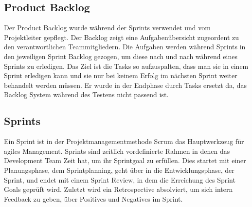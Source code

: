 \subsection{Product Backlog}\label{subsec:product-backlog}
%

Der Product Backlog wurde während der Sprints verwendet und vom Projektleiter gepflegt. Der Backlog zeigt eine Aufgabenübersicht zugeordent zu den verantwortlichen Teammitgliedern.
Die Aufgaben werden während Sprints in den jeweiligen Sprint Backlog gezogen, um diese nach und nach während eines Sprints zu erledigen.
Das Ziel ist die Tasks so aufzuspalten, dass man sie in einem Sprint erledigen kann und sie nur bei keinem Erfolg im nächsten Sprint weiter behandelt werden müssen.
Er wurde in der Endphase durch Tasks ersetzt da, das Backlog System während des Testens nicht passend ist.
%

\subsection{Sprints}\label{subsec:sprints}
%
Ein Sprint ist in der Projektmanagementmethode Scrum das Hauptwerkzeug für agiles Management. Sprints sind zeitlich vordefinierte Rahmen in denen das Development Team Zeit hat, um ihr Sprintgoal zu erfüllen.
Dies startet mit einer Planungsphase, dem Sprintplanning, geht über in die Entwicklungsphase, der Sprint, und endet mit einem Sprint Review, in dem die Erreichung des Sprint Goals geprüft wird.
Zuletzt wird ein Retrospective absolviert, um sich intern Feedback zu geben, über Positives und Negatives im Sprint.
%

\renewcommand{\kapitelautor}{}
